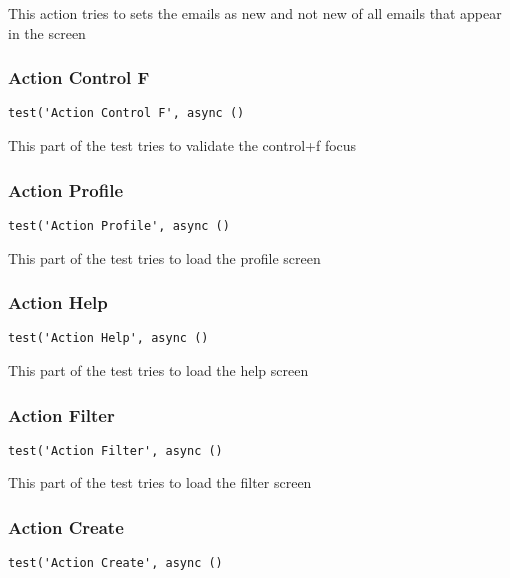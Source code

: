 \documentclass[a4paper]{article}
\begin{document}
This action tries to sets the emails as new and not new of all emails that
appear in the screen

\hypertarget{toc138}{}
\subsubsection{Action Control F}

\begin{lstlisting}
test('Action Control F', async ()
\end{lstlisting}

This part of the test tries to validate the control+f focus

\hypertarget{toc139}{}
\subsubsection{Action Profile}

\begin{lstlisting}
test('Action Profile', async ()
\end{lstlisting}

This part of the test tries to load the profile screen

\hypertarget{toc140}{}
\subsubsection{Action Help}

\begin{lstlisting}
test('Action Help', async ()
\end{lstlisting}

This part of the test tries to load the help screen

\hypertarget{toc141}{}
\subsubsection{Action Filter}

\begin{lstlisting}
test('Action Filter', async ()
\end{lstlisting}

This part of the test tries to load the filter screen

\hypertarget{toc142}{}
\subsubsection{Action Create}

\begin{lstlisting}
test('Action Create', async ()
\end{lstlisting}
\end{document}
